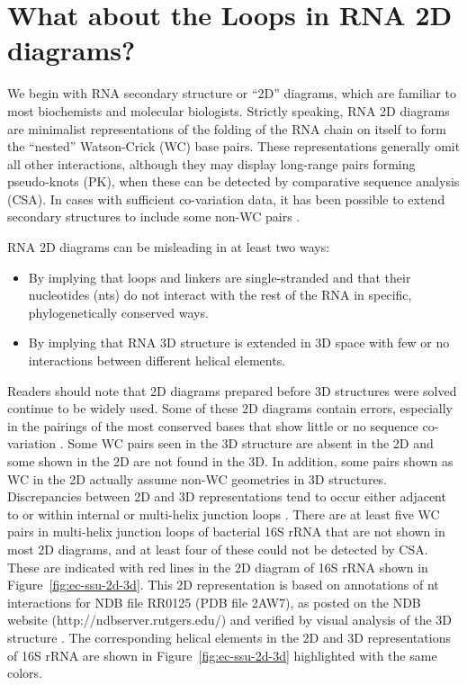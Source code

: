 \section{What about the Loops in RNA 2D diagrams?}

We begin with RNA secondary structure or ``2D'' diagrams, which are familiar to
most biochemists and molecular biologists. Strictly speaking, RNA 2D diagrams
are minimalist representations of the folding of the RNA chain on itself to form
the ``nested'' Watson-Crick (WC) base pairs. These representations generally omit
all other interactions, although they may display long-range pairs forming
pseudo-knots (PK), when these can be detected by comparative sequence analysis
(CSA). In cases with sufficient co-variation data, it has been possible to
extend secondary structures to include some non-WC pairs \cite{Gutell1994}. 

RNA 2D diagrams can be misleading in at least two ways: 
\begin{itemize}
  \item By implying that loops and linkers are single-stranded and that their
    nucleotides (nts) do not interact with the rest of the RNA in specific,
    phylogenetically conserved ways.

  \item By implying that RNA 3D structure is extended in 3D space with few or no
    interactions between different helical elements. 
\end{itemize}

Readers should note that 2D diagrams prepared before 3D structures were solved
continue to be widely used. Some of these 2D diagrams contain errors, especially
in the pairings of the most conserved bases that show little or no sequence
co-variation \cite{Petrov2013a}. Some WC pairs seen in the 3D structure are
absent in the 2D and some shown in the 2D are not found in the 3D. In addition,
some pairs shown as WC in the 2D actually assume non-WC geometries in 3D
structures. Discrepancies between 2D and 3D representations tend to occur either
adjacent to or within internal or multi-helix junction loops \cite{Petrov2013}.
There are at least five WC pairs in multi-helix junction loops of bacterial 16S
rRNA that are not shown in most 2D diagrams, and at least four of these could
not be detected by CSA. These are indicated with red lines in the 2D diagram of
\EC{} 16S rRNA shown in Figure~\ref{fig:ec-ssu-2d-3d}. This 2D representation is based on
annotations of nt interactions for NDB file RR0125 (PDB file 2AW7), as posted on
the NDB website (http://ndbserver.rutgers.edu/) and verified by visual analysis
of the 3D structure \cite{CoimbatoreNarayanan2014}. The corresponding helical elements in the 2D and 3D
representations of 16S rRNA are shown in Figure~\ref{fig:ec-ssu-2d-3d} highlighted with the same
colors. 

